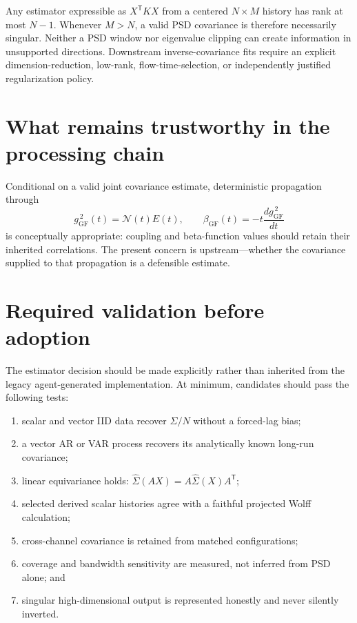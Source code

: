 \documentclass[11pt]{article}
\newcommand{\GF}{\mathrm{GF}}
\begin{document}
Any estimator expressible as \(X^{\mathsf T}KX\) from a centered
\(N\times M\) history has rank at most \(N-1\). Whenever \(M>N\), a valid PSD
covariance is therefore necessarily singular. Neither a PSD window nor
eigenvalue clipping can create information in unsupported directions.
Downstream inverse-covariance fits require an explicit dimension-reduction,
low-rank, flow-time-selection, or independently justified regularization
policy.

\section{What remains trustworthy in the processing chain}

Conditional on a valid joint covariance estimate, deterministic propagation
through
\[
  g_{\GF}^{\,2}(t)=\mathcal N(t)E(t),
  \qquad
  \beta_{\GF}(t)=-t\frac{d g_{\GF}^{\,2}}{dt}
\]
is conceptually appropriate: coupling and beta-function values should retain
their inherited correlations. The present concern is upstream---whether the
covariance supplied to that propagation is a defensible estimate.

\section{Required validation before adoption}

The estimator decision should be made explicitly rather than inherited from
the legacy agent-generated implementation. At minimum, candidates should
pass the following tests:
\begin{enumerate}[itemsep=0.35em]
  \item scalar and vector IID data recover \(\Sigma/N\) without a forced-lag
    bias;
  \item a vector AR or VAR process recovers its analytically known long-run
    covariance;
  \item linear equivariance holds:
    \(\widehat\Sigma(AX)=A\widehat\Sigma(X)A^{\mathsf T}\);
  \item selected derived scalar histories agree with a faithful projected
    Wolff calculation;
  \item cross-channel covariance is retained from matched configurations;
  \item coverage and bandwidth sensitivity are measured, not inferred from
    PSD alone; and
  \item singular high-dimensional output is represented honestly and never
    silently inverted.
\end{enumerate}
\end{document}
